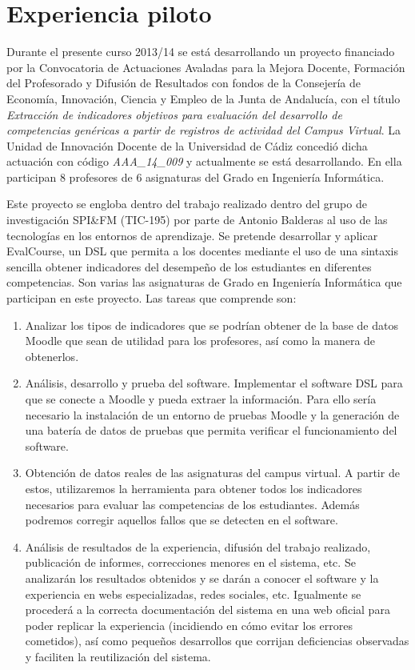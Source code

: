 \section{Experiencia piloto}
Durante el presente curso 2013/14 se está desarrollando un proyecto financiado por la Convocatoria de Actuaciones Avaladas para la Mejora Docente, Formación del Profesorado y Difusión de Resultados con fondos de la Consejería de Economía, Innovación, Ciencia y Empleo de la Junta de Andalucía, con el título \emph{Extracción de indicadores objetivos para evaluación del desarrollo de competencias genéricas a partir de registros de actividad del Campus Virtual}. La Unidad de Innovación Docente de la Universidad de Cádiz concedió dicha actuación con código \emph{AAA\_14\_009} y actualmente se está desarrollando. En ella participan 8 profesores de 6 asignaturas del Grado en Ingeniería Informática.

Este proyecto se engloba dentro del trabajo realizado dentro del grupo de investigación SPI\&FM (TIC-195) por parte de Antonio Balderas al uso de las tecnologías en los entornos de aprendizaje. Se pretende desarrollar y aplicar EvalCourse, un DSL que permita a los docentes mediante el uso de una sintaxis sencilla obtener indicadores del desempeño de los estudiantes en diferentes competencias. Son varias las asignaturas de Grado en Ingeniería Informática que participan en este proyecto. Las tareas que comprende son:

\begin{enumerate}
\item Analizar los tipos de indicadores que se podrían obtener de la base de datos Moodle que sean de utilidad para los profesores, así como la manera de obtenerlos.
\item Análisis, desarrollo y prueba del software. Implementar el software DSL para que se conecte a Moodle y pueda extraer la información. Para ello sería necesario la instalación de un entorno de pruebas Moodle y la generación de una batería de datos de pruebas que permita verificar el funcionamiento del software.
\item Obtención de datos reales de las asignaturas del campus virtual. A partir de estos, utilizaremos la herramienta para obtener todos los indicadores necesarios para evaluar las competencias de los estudiantes. Además podremos corregir aquellos fallos que se detecten en el software.
\item Análisis de resultados de la experiencia, difusión del trabajo realizado, publicación de informes, correcciones menores en el sistema, etc. Se analizarán los resultados obtenidos y se darán a conocer el software y la experiencia en webs especializadas, redes sociales, etc. Igualmente se procederá a la correcta documentación del sistema en una web oficial para poder replicar la experiencia (incidiendo en cómo evitar los errores cometidos), así como pequeños desarrollos que corrijan deficiencias observadas y faciliten la reutilización del sistema.
\end{enumerate}


